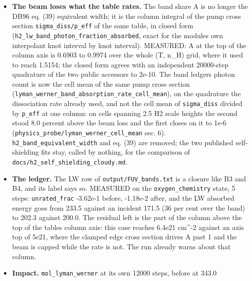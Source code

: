 \documentclass[english,a4paper]{my_memo}
\begin{document}
\begin{itemize}
\begin{itemize}
    reproduced the shipped module byte for byte before the change, so the
    only difference is the band. \texttt{sigma\_pump} at the bottom of the column
    axis is 1.701e-17 (700 K) to 1.887e-17 cm\^{}2, which is DB96\textquotesingle s own
    2.557e-17 per 912-1110 A photon restated per 912-1201 A photon
    (1.676e-17) to 1-13 percent, the same agreement as before.
  \item
    \textbf{The beam loses what the table rates.} The band share A is no longer
    the DB96 eq. (39) equivalent width; it is the column integral of the
    pump cross section \texttt{sigma\_diss/p\_eff} of the same table, in closed form
    (\texttt{h2\_lw\_band\_photon\_fraction\_absorbed}, exact for the module\textquotesingle s own
    interpolant knot interval by knot interval). MEASURED: A at the top of
    the column axis is 0.6903 to 0.9974 over the whole (T, n\_H) grid, where
    it used to reach 1.5154; the closed form agrees with an independent
    20000-step quadrature of the two public accessors to 2e-10. The band
    ledger\textquotesingle s photon count is now the cell mean of the same pump cross
    section (\texttt{lyman\_werner\_band\_absorption\_rate\_cell\_mean}), on the
    quadrature the dissociation rate already used, and not the cell mean of
    \texttt{sigma\_diss} divided by \texttt{p\_eff} at one column: on cells spanning 2.5 H2
    scale heights the second stood 8.0 percent above the beam loss and the
    first closes on it to 1e-6 (\texttt{physics\_probe/lyman\_werner\_cell\_mean}
    sec. 6). \texttt{h2\_band\_equivalent\_width} and eq. (39) are removed; the two
    published self-shielding fits stay, called by nothing, for the
    comparison of \texttt{docs/h2\_self\_shielding\_cloudy.md}.
  \item
    \textbf{The ledger.} The LW row of \texttt{output/FUV\_bands.txt} is a closure like
    B3 and B4, and its label says so. MEASURED on the \texttt{oxygen\_chemistry}
    state, 5 steps: \texttt{unrated\_frac} -3.62e-1 before, -1.18e-2 after, and the
    LW absorbed energy goes from 233.5 against an incident 171.5 (36 per
    cent over the band) to 202.3 against 200.0. The residual left is the
    part of the column above the top of the table\textquotesingle s column axis: this case
    reaches 6.4e21 cm\^{}-2 against an axis top of 5e21, where the clamped edge
    cross section drives A past 1 and the beam is capped while the rate is
    not. The run already warns about that column.
  \item
    \textbf{Impact.} \texttt{mol\_lyman\_werner} at its own 12000 steps, before at 343.0

\end{itemize}
\end{itemize}
\end{document}
